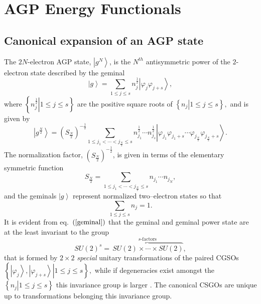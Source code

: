 \documentclass[aps,preprint]{revtex4}%
\begin{document}
\section{AGP Energy Functionals\label{AGP}}

\subsection{Canonical expansion of an AGP state}

\bigskip The $2N$-electron AGP state, $\left\vert g^{N}\right\rangle $, is the
$N^{th}$ antisymmetric power of the $2$-electron state described by the
geminal
\begin{equation}
\left\vert g\right\rangle =\sum_{1\leq j\leq s}n_{j}^{\frac{1}{2}}\left\vert
\varphi_{j}\varphi_{j+s}\right\rangle , \label{geminal}%
\end{equation}
where $\left\{  \left.  n_{j}^{\frac{1}{2}}\right\vert 1\leq j\leq s\right\}
$ are the positive square roots of $\left\{  \left.  n_{j}\right\vert 1\leq
j\leq s\right\}  ,$ and is given by \cite{Weiner&ortiz04}
\begin{equation}
\left\vert g^{\frac{N}{2}}\right\rangle =\left(  S_{\frac{N}{2}}\right)
^{-\frac{1}{2}}\sum_{1\leq j_{1}<\cdots<j_{\frac{N}{2}}\leq s}n_{j_{1}}%
^{\frac{1}{2}}\cdots n_{j_{s}}^{\frac{1}{2}}\left\vert \varphi_{j_{1}}%
\varphi_{j_{1}+s}\cdots\varphi_{j_{\frac{N}{2}}}\varphi_{j_{\frac{N}{2}}%
+s}\right\rangle . \label{agp}%
\end{equation}
The normalization factor, $\left(  S_{\frac{N}{2}}\right)  ^{-\frac{1}{2}}$,
is given in terms of the elementary symmetric function
\begin{equation}
S_{\frac{N}{2}}=\sum_{1\leq j_{1}<\cdots<j_{\frac{N}{2}}\leq s}n_{j_{1}}\cdots
n_{j_{N}},
\end{equation}
and the geminals $\left\vert g\right\rangle $ represent normalized
two--electron states so that
\begin{equation}
\sum_{1\leq j\leq s}n_{j}=1.
\end{equation}
It is evident from eq.\ $\left(  \ref{geminal}\right)  $ that the geminal and
geminal power state are at the least invariant to the group
\begin{equation}
SU\left(  2\right)  ^{s}=\overset{s\text{-factors}}{\overbrace{\,SU\left(
2\right)  \times\cdots\times SU\left(  2\right)  }},
\end{equation}
that is formed by $2\times2$ \emph{special} unitary transformations of the
paired CGSOs $\left\{  \left.  \left\vert \varphi_{j}\right\rangle ,\left\vert
\varphi_{j+s}\right\rangle \right\vert 1\leq j\leq s\right\}  ,$ while if
degeneracies exist amongst the $\left\{  \left.  n_{j}\right\vert 1\leq j\leq
s\right\}  $ this invariance group is larger \cite{AGPCoherent}. The canonical
CSGOs are unique up to transformations belonging this invariance group.
\end{document}
